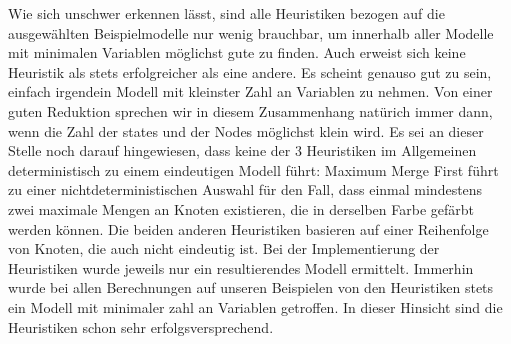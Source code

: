 \documentclass[a4paper]{article}
\theoremstyle{nonumberplain}
\begin{document}
Wie sich unschwer erkennen lässt, sind alle Heuristiken bezogen auf die ausgewählten Beispielmodelle nur wenig brauchbar, um innerhalb aller Modelle mit minimalen Variablen möglichst gute zu finden. Auch erweist sich keine Heuristik als stets erfolgreicher als eine andere. Es scheint genauso gut zu sein, einfach irgendein Modell mit kleinster Zahl an Variablen zu nehmen. Von einer guten Reduktion sprechen wir in diesem Zusammenhang natürich immer dann, wenn die Zahl der states und der Nodes möglichst klein wird. Es sei an dieser Stelle noch darauf hingewiesen, dass keine der 3 Heuristiken im Allgemeinen deterministisch zu einem eindeutigen Modell führt: Maximum Merge First führt zu einer nichtdeterministischen Auswahl für den Fall, dass einmal mindestens zwei maximale Mengen an Knoten existieren, die in derselben Farbe gefärbt werden können. Die beiden anderen Heuristiken basieren auf einer Reihenfolge von Knoten, die auch nicht eindeutig ist. Bei der Implementierung der Heuristiken wurde jeweils nur ein resultierendes Modell ermittelt. Immerhin wurde bei allen Berechnungen auf unseren Beispielen von den Heuristiken stets ein Modell mit minimaler zahl an Variablen getroffen. In dieser Hinsicht sind die Heuristiken schon sehr erfolgsversprechend.
\end{document}
